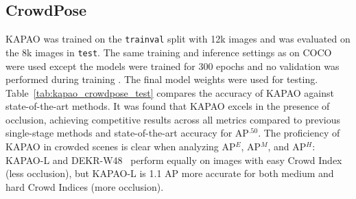 \documentclass[runningheads]{llncs}
\newcommand\hll[1]{\bgroup
  \hskip0pt\color{black}#1\egroup
}
\newcommand\hlll[1]{\bgroup
  \hskip0pt\color{black}#1\egroup
}
\begin{document}
\subsection{CrowdPose}
\label{sec:kapao_crowdpose}
KAPAO was trained on the \texttt{trainval} split with 12k images and was evaluated on the 8k images in \texttt{test}. The same training and inference settings as on COCO were used except the models were trained for 300 epochs and no validation was performed \hlll{during training}. The final model weights were used for testing. Table~\ref{tab:kapao_crowdpose_test} compares the accuracy of KAPAO against state-of-the-art methods. It was found that KAPAO excels in the presence of occlusion, \hll{achieving competitive results across all metrics compared to previous single-stage methods and state-of-the-art accuracy for AP$^{.50}$.} The proficiency of KAPAO in crowded scenes is clear when analyzing AP$^E$, AP$^M$, and AP$^H$: KAPAO-L and DEKR-W48~\cite{geng2021bottom} perform equally on images with easy Crowd Index (less occlusion), but KAPAO-L is 1.1 AP more accurate for both medium and hard Crowd Indices (more occlusion). 
\end{document}
